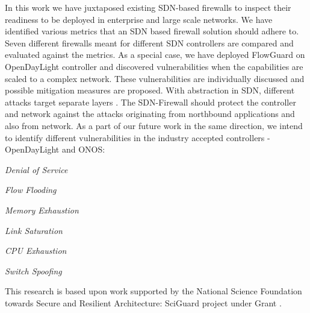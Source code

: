 In this work we have juxtaposed existing SDN-based firewalls to inspect their readiness to be deployed in enterprise and large scale networks. We have identified various metrics that an SDN based firewall solution should adhere to. Seven different firewalls meant for different SDN controllers are compared and evaluated against the metrics. As a special case, we have deployed FlowGuard\cite{FLOWGUARD} on OpenDayLight controller and discovered vulnerabilities when the capabilities are scaled to a complex network. These vulnerabilities are individually discussed and possible mitigation measures are proposed. With abstraction in SDN, different attacks target separate layers \cite{SECSDN}. The SDN-Firewall should protect the controller and network against the attacks originating from northbound applications and also from network. As a part of our future work in the same direction, we intend to identify different vulnerabilities in the industry accepted controllers - OpenDayLight and ONOS: 
 \begin{enumerate*}
 	\item \textit{Denial of Service}\item \textit{Flow Flooding}\item \textit{Memory Exhaustion}
 	\item \textit{Link Saturation}
 	\item \textit{CPU Exhaustion}
 	\item \textit{Switch Spoofing}
 \end{enumerate*}
 
\begin{acks}
	This research is based upon work supported by the National Science Foundation towards Secure and Resilient Architecture: SciGuard project under Grant .
\end{acks}
